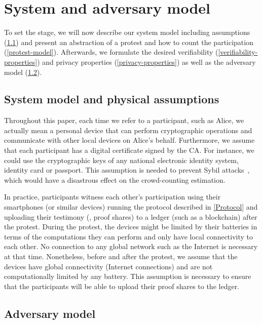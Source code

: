 \section{System and adversary model}%
\label{system-model}

To set the stage, we will now describe our system model including assumptions (\cref{assumptions}) and present an abstraction of a protest and how to
count the participation (\cref{protest-model}). 
Afterwards, we formulate the desired verifiability (\cref{verifiability-properties}) and privacy properties
(\cref{privacy-properties}) as well as the adversary model (\cref{adversary-model}).

\subsection{System model and physical assumptions}
\label{assumptions}

Throughout this paper, each time we refer to a participant, such as Alice, we actually mean a personal device that can perform cryptographic operations and communicate with other local devices on Alice's behalf. 
Furthermore, we assume that each participant has a digital certificate signed by the \ac{CA}.
For instance, we could use the cryptographic keys of any national electronic identity system, identity card or passport.
This assumption is needed to prevent Sybil attacks~\cite{SybilAttack}, which would have a disastrous effect on the crowd-counting estimation.

In practice, participants witness each other's participation using their smartphones (or similar devices) running the protocol described in \cref{Protocol} and uploading their testimony (\ie, proof shares) to a ledger (such as a blockchain) after the protest. 
During the protest, the devices might be limited by their batteries in terms of the computations they can perform and only have local connectivity to each other.
No connection to any global network such as the Internet is necessary at that time.  
Nonetheless, before and after the protest, we assume that the devices have global connectivity (\ie Internet connections) and are not computationally limited by any battery.
This assumption is necessary to ensure that the participants will be able to upload their proof shares to the ledger.




\subsection{Adversary model}
\label{adversary-model}
